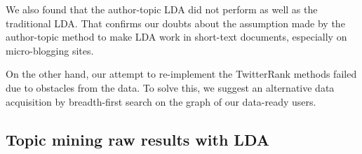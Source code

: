 \documentclass[11pt]{article}
\begin{document}
We also found that the author-topic LDA did not perform as well as the traditional LDA. That confirms our doubts about the assumption made by the author-topic method to make LDA work in short-text documents, especially on micro-blogging sites.

On the other hand, our attempt to re-implement the TwitterRank methods failed due to obstacles from the data. To solve this, we suggest an alternative data acquisition by breadth-first search on the graph of our data-ready users.




\begin{appendices}

\section{Topic mining raw results with LDA}


\end{appendices}
\end{document}
